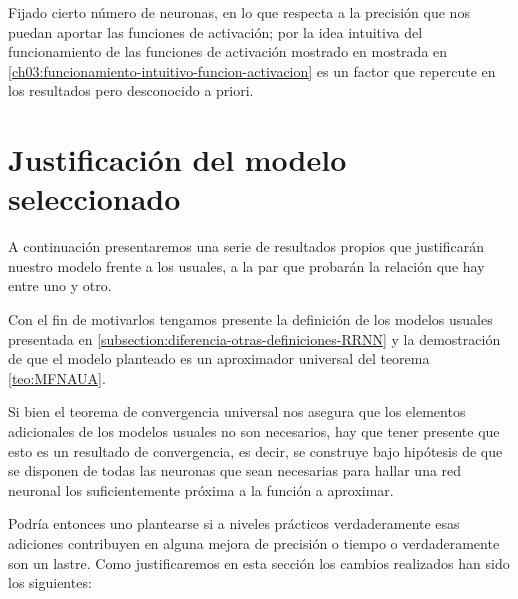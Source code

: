 Fijado cierto número de neuronas, en lo que respecta a la precisión que nos puedan aportar las funciones de activación; por la idea intuitiva 
del funcionamiento de las funciones de activación mostrado en mostrada en \ref{ch03:funcionamiento-intuitivo-funcion-activacion} es un factor que repercute en los resultados 
pero desconocido a priori. 



\section{Justificación del modelo seleccionado}
\label{ch05:justifica-modelo}
A continuación presentaremos una serie de resultados
propios que justificarán nuestro modelo frente a los
usuales, a la par que probarán la relación que hay entre uno y otro.  

Con el fin de motivarlos tengamos presente la definición de los modelos usuales presentada en 
\ref{subsection:diferencia-otras-definiciones-RRNN} 
y la demostración de que el modelo planteado  
es un aproximador universal del teorema \ref{teo:MFNAUA}. 

Si bien el teorema de convergencia universal
nos asegura que los elementos adicionales de los 
modelos usuales no son necesarios, 
hay que tener presente que esto es un resultado 
de convergencia, es decir, se construye bajo hipótesis 
de que se disponen de todas las neuronas que sean necesarias para hallar una red neuronal los suficientemente próxima a la función a aproximar.  

Podría entonces uno plantearse si a niveles prácticos
verdaderamente esas adiciones contribuyen en 
alguna mejora de precisión o tiempo o verdaderamente 
son un lastre.  Como justificaremos en esta sección los cambios realizados han sido los siguientes: 

